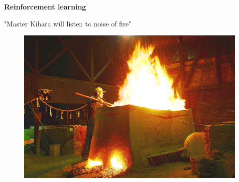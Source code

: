 \documentclass[xcolor=dvipsnames]{beamer}
\begin{document}
\begin{frame}{\bf Reinforcement learning}

"Master Kihara will listen to noise of fire"
\begin{figure}
  \includegraphics[scale=0.3]{../../pictures/tatara.jpg}
\end{figure}

\end{frame}
\end{document}
